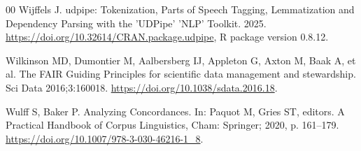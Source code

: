 \documentclass[preprint,12pt,a4paper]{elsarticle}
\begin{document}
\begin{thebibliography}{00}
 Wijffels J. udpipe: Tokenization, Parts of Speech Tagging, Lemmatization and Dependency Parsing with the 'UDPipe' 'NLP' Toolkit. 2025. \url{https://doi.org/10.32614/CRAN.package.udpipe}, R package version 0.8.12.

 Wilkinson MD, Dumontier M, Aalbersberg IJ, Appleton G, Axton M, Baak A, et al. The FAIR Guiding Principles for scientific data management and stewardship. Sci Data 2016;3:160018. \url{https://doi.org/10.1038/sdata.2016.18}.

 Wulff S, Baker P. Analyzing Concordances. In: Paquot M, Gries ST, editors. A Practical Handbook of Corpus Linguistics, Cham: Springer; 2020, p. 161–179. \url{https://doi.org/10.1007/978-3-030-46216-1_8}.

\end{thebibliography}
\end{document}
